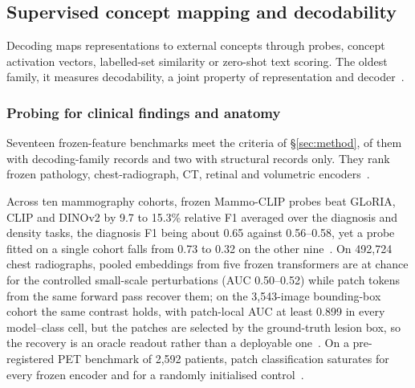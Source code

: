 \subsection{Supervised concept mapping and decodability}
\label{sec:decoding}

Decoding maps representations to external concepts through probes, concept activation vectors,
labelled-set similarity or zero-shot text scoring. The oldest family, it measures decodability, a joint
property of representation and decoder~\cite{alain2016understanding,belinkov2021probing,hewitt2019designing,elazar2020amnesic}.

\subsubsection{Probing for clinical findings and anatomy}

Seventeen frozen-feature benchmarks meet the criteria of \S\ref{sec:method}, \Nbenchdec{} of
them with decoding-family records and two with structural records only. They rank
frozen pathology, chest-radiograph, CT, retinal and volumetric
encoders~\cite{neidlinger2025benchmark,marza2025thunder,li2025featurequality,li2025embeddings,chevli2026frozenct,zhou2025generalist,aerts2025foundation}.

Across ten mammography cohorts, frozen Mammo-CLIP probes beat GLoRIA, CLIP and DINOv2 by 9.7 to 15.3\% relative F1
averaged over the diagnosis and density tasks, the diagnosis F1 being about 0.65 against 0.56--0.58, yet a probe fitted
on a single cohort falls from 0.73 to 0.32 on the other nine~\cite{germani2025bias}. On 492,724 chest radiographs, pooled embeddings from five frozen
transformers are at chance for the controlled small-scale perturbations (AUC 0.50--0.52) while patch tokens
from the same forward pass recover them; on the 3,543-image bounding-box cohort the same contrast holds, with
patch-local AUC at least 0.899 in every model--class cell, but the patches are selected by the ground-truth
lesion box, so the recovery is an oracle readout rather than a deployable one~\cite{muthyala2026frozen}. On a
pre-registered PET benchmark of 2,592 patients, patch classification saturates for every frozen
encoder and for a randomly initialised control~\cite{farquhar2026pretraining}.

